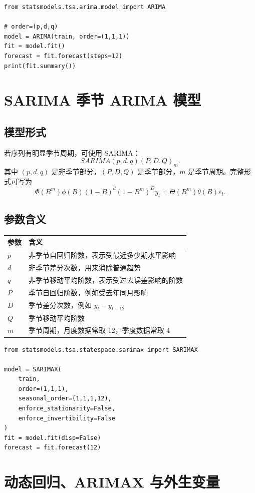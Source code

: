 \documentclass[11pt,a4paper]{ctexart}
\begin{document}
\begin{lstlisting}
from statsmodels.tsa.arima.model import ARIMA

# order=(p,d,q)
model = ARIMA(train, order=(1,1,1))
fit = model.fit()
forecast = fit.forecast(steps=12)
print(fit.summary())
\end{lstlisting}

\section{SARIMA 季节 ARIMA 模型}
\subsection{模型形式}
若序列有明显季节周期，可使用 SARIMA：
\[
SARIMA(p,d,q)(P,D,Q)_m.
\]
其中 $(p,d,q)$ 是非季节部分，$(P,D,Q)$ 是季节部分，$m$ 是季节周期。完整形式可写为
\[
\Phi(B^m)\phi(B)(1-B)^d(1-B^m)^D y_t
=\Theta(B^m)\theta(B)\varepsilon_t.
\]

\subsection{参数含义}
\begin{longtable}{p{2.6cm}p{10.5cm}}
\toprule
参数 & 含义 \\
\midrule
$p$ & 非季节自回归阶数，表示受最近多少期水平影响 \\
$d$ & 非季节差分次数，用来消除普通趋势 \\
$q$ & 非季节移动平均阶数，表示受过去误差影响的阶数 \\
$P$ & 季节自回归阶数，例如受去年同月影响 \\
$D$ & 季节差分次数，例如 $y_t-y_{t-12}$ \\
$Q$ & 季节移动平均阶数 \\
$m$ & 季节周期，月度数据常取 12，季度数据常取 4 \\
\bottomrule
\end{longtable}

\begin{lstlisting}
from statsmodels.tsa.statespace.sarimax import SARIMAX

model = SARIMAX(
    train,
    order=(1,1,1),
    seasonal_order=(1,1,1,12),
    enforce_stationarity=False,
    enforce_invertibility=False
)
fit = model.fit(disp=False)
forecast = fit.forecast(12)
\end{lstlisting}

\section{动态回归、ARIMAX 与外生变量}
\end{document}
